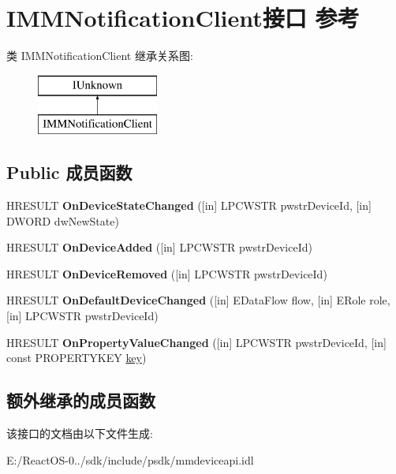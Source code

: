 \hypertarget{interface_i_m_m_notification_client}{}\section{I\+M\+M\+Notification\+Client接口 参考}
\label{interface_i_m_m_notification_client}
类 I\+M\+M\+Notification\+Client 继承关系图\+:\begin{figure}[H]
\begin{center}
\leavevmode
\includegraphics[height=2.000000cm]{interface_i_m_m_notification_client}
\end{center}
\end{figure}
\subsection*{Public 成员函数}
\begin{DoxyCompactItemize}
\item 
\mbox{\label{interface_i_m_m_notification_client_a6e11dcc15e1373acc44a587ee0c86e26}} 
H\+R\+E\+S\+U\+LT {\bfseries On\+Device\+State\+Changed} (\mbox{[}in\mbox{]} L\+P\+C\+W\+S\+TR pwstr\+Device\+Id, \mbox{[}in\mbox{]} D\+W\+O\+RD dw\+New\+State)
\item 
\mbox{\label{interface_i_m_m_notification_client_a7252b445acb6ec4d97efd46713426516}} 
H\+R\+E\+S\+U\+LT {\bfseries On\+Device\+Added} (\mbox{[}in\mbox{]} L\+P\+C\+W\+S\+TR pwstr\+Device\+Id)
\item 
\mbox{\label{interface_i_m_m_notification_client_a8bc29d24917a4a13f8a47994ce174fe4}} 
H\+R\+E\+S\+U\+LT {\bfseries On\+Device\+Removed} (\mbox{[}in\mbox{]} L\+P\+C\+W\+S\+TR pwstr\+Device\+Id)
\item 
\mbox{\label{interface_i_m_m_notification_client_aff4f06c4fba2baa0a7c1b4f65d6c4ac8}} 
H\+R\+E\+S\+U\+LT {\bfseries On\+Default\+Device\+Changed} (\mbox{[}in\mbox{]} E\+Data\+Flow flow, \mbox{[}in\mbox{]} E\+Role role, \mbox{[}in\mbox{]} L\+P\+C\+W\+S\+TR pwstr\+Device\+Id)
\item 
\mbox{\label{interface_i_m_m_notification_client_a2710b8e6539f1cd6709ecfaf83f17ecb}} 
H\+R\+E\+S\+U\+LT {\bfseries On\+Property\+Value\+Changed} (\mbox{[}in\mbox{]} L\+P\+C\+W\+S\+TR pwstr\+Device\+Id, \mbox{[}in\mbox{]} const P\+R\+O\+P\+E\+R\+T\+Y\+K\+EY \hyperlink{structkey}{key})
\end{DoxyCompactItemize}
\subsection*{额外继承的成员函数}


该接口的文档由以下文件生成\+:\begin{DoxyCompactItemize}
\item 
E\+:/\+React\+O\+S-\/0../sdk/include/psdk/mmdeviceapi.\+idl\end{DoxyCompactItemize}
